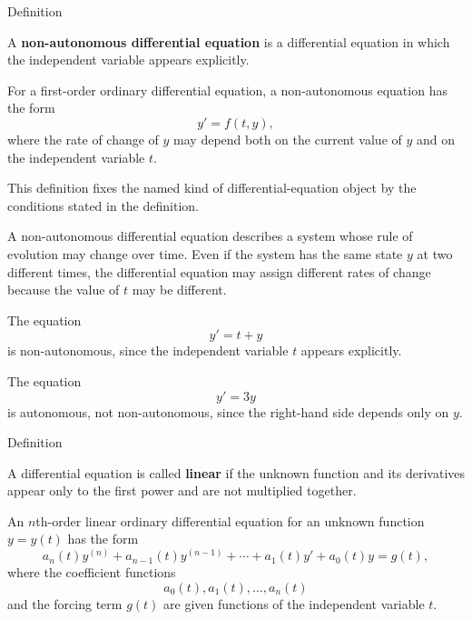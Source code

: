 \begin{definitionbox}{Definition}
\begin{definition}
\label{def:ordinary-differential-equations-terminology-non-autonomous-differential-equation}
A \textbf{non-autonomous differential equation} is a differential equation in which the independent variable appears explicitly.

For a first-order ordinary differential equation, a non-autonomous equation has the form
\[
y'=f(t,y),
\]
where the rate of change of $y$ may depend both on the current value of $y$ and on the independent variable $t$.
\end{definition}
\end{definitionbox}

\begin{remark*}
This definition fixes the named kind of differential-equation object by the
conditions stated in the definition.
\end{remark*}

\NoLocalDependencies

\begin{remark*}[Interpretation]
A non-autonomous differential equation describes a system whose rule of evolution may change over time. Even if the system has the same state $y$ at two different times, the differential equation may assign different rates of change because the value of $t$ may be different.
\end{remark*}

\begin{example*}
The equation
\[
y'=t+y
\]
is non-autonomous, since the independent variable $t$ appears explicitly.

The equation
\[
y'=3y
\]
is autonomous, not non-autonomous, since the right-hand side depends only on $y$.
\end{example*}



\begin{definitionbox}{Definition}
\begin{definition}
\label{def:ordinary-differential-equations-terminology-linear-differential-equation}
A differential equation is called \textbf{linear} if the unknown function and its derivatives appear only to the first power and are not multiplied together.

An $n$th-order linear ordinary differential equation for an unknown function $y=y(t)$ has the form
\[
a_n(t)y^{(n)}+a_{n-1}(t)y^{(n-1)}+\cdots+a_1(t)y'+a_0(t)y=g(t),
\]
where the coefficient functions
\[
a_0(t),a_1(t),\dots,a_n(t)
\]
and the forcing term $g(t)$ are given functions of the independent variable $t$.
\end{definition}
\end{definitionbox}

